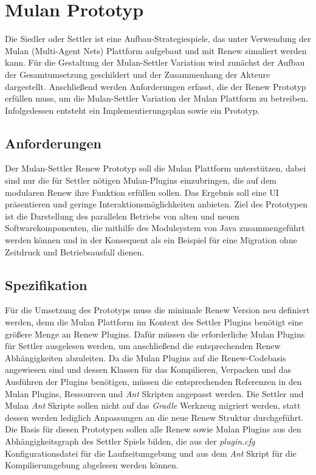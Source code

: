 \chapter{Mulan Prototyp} \label{cha:mulan_settler}
	Die Siedler oder Settler ist eine Aufbau-Strategiespiele, das unter Verwendung der Mulan (Multi-Agent Nets) Plattform aufgebaut und mit Renew simuliert werden kann. \bigbreak
	Für die Gestaltung der Mulan-Settler Variation wird zunächst der Aufbau der Gesamtumsetzung geschildert und der Zusammenhang der Akteure dargestellt. Anschließend werden Anforderungen erfasst, die der Renew Prototyp erfüllen muss, um die Mulan-Settler Variation der Mulan Plattform zu betreiben. Infolgedessen entsteht ein Implementierungsplan sowie ein Prototyp.

\section{Anforderungen} \label{sec:anforderungen2}
	Der Mulan-Settler Renew Prototyp soll die Mulan Plattform unterstützen, dabei sind nur die für Settler nötigen Mulan-Plugins einzubringen, die auf dem modularen Renew ihre Funktion erfüllen sollen. Das Ergebnis soll eine UI präsentieren und geringe Interaktionsmöglichkeiten anbieten. \newline 
	Ziel des Prototypen ist die Darstellung des parallelen Betriebs von alten und neuen Softwarekomponenten, die mithilfe des Modulsystem von Java zusammengeführt werden können und in der Konsequent als ein Beispiel für eine Migration ohne  Zeitdruck und Betriebsausfall dienen.

\section{Spezifikation}
	Für die Umsetzung des Prototyps muss die minimale Renew Version neu definiert werden, denn die Mulan Plattform im Kontext des Settler Plugins benötigt eine größere Menge an Renew Plugins. Dafür müssen die erforderliche Mulan Plugins für Settler ausgelesen werden, um anschließend die entsprechenden Renew Abhängigkeiten abzuleiten. \newline
	Da die Mulan Plugins auf die Renew-Codebasis angewiesen sind und dessen Klassen für das Kompilieren, Verpacken und das Ausführen der Plugins benötigen, müssen die entsprechenden Referenzen in den Mulan Plugins, Ressourcen und \textit{Ant} Skripten angepasst werden. \newline
	Die Settler und Mulan \textit{Ant} Skripte sollen nicht auf das \textit{Gradle} Werkzeug migriert werden, statt dessen werden lediglich Anpassungen an die neue Renew Struktur durchgeführt. \bigbreak
	Die Basis für diesen Prototypen sollen alle Renew sowie Mulan Plugins aus den Abhängigkeitsgraph des Settler Spiels bilden, die aus der \textit{plugin.cfg} Konfigurationsdatei für die Laufzeitumgebung und aus dem \textit{Ant} Skript für die Kompilierumgebung abgelesen werden können. 


